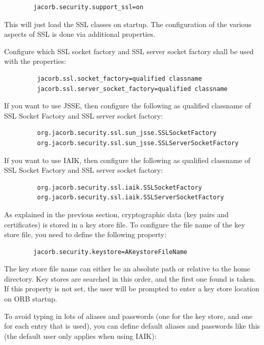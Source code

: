 \begin{verbatim}
        jacorb.security.support_ssl=on
\end{verbatim}

This will just load the SSL classes on startup. The configuration of the
various aspects of SSL is done via additional properties.

Configure which SSL socket factory and SSL server socket factory shall
be used with the properties:
\begin{verbatim}
         jacorb.ssl.socket_factory=qualified classname
         jacorb.ssl.server_socket_factory=qualified classname
\end{verbatim}

If you want to use JSSE, then configure the following as qualified
classname of SSL Socket Factory and SSL server socket factory:
\begin{verbatim}
         org.jacorb.security.ssl.sun_jsse.SSLSocketFactory
         org.jacorb.security.ssl.sun_jsse.SSLServerSocketFactory
\end{verbatim}

If you want to use IAIK, then configure the following as qualified
classname of SSL Socket Factory and SSL server socket factory:
\begin{verbatim}
         org.jacorb.security.ssl.iaik.SSLSocketFactory
         org.jacorb.security.ssl.iaik.SSLServerSocketFactory
\end{verbatim}

As explained  in the previous  section, cryptographic data  (key pairs
and  certificates) is  stored in  a  key store  file. To configure the
file name of the key store file, you need to define the following
property:

\begin{verbatim}
        jacorb.security.keystore=AKeystoreFileName
\end{verbatim}

The key store file name can either be an absolute path or relative to
the home directory. Key stores are searched in this order, and the
first one found is taken. If this property is not set, the user will be
prompted to enter a key store location on ORB startup.

To avoid  typing in  lots of  aliases and passwords  (one for  the key
store, and  one for each entry  that is used), you  can define default
aliases and passwords like this (the default user only applies when
using IAIK):

